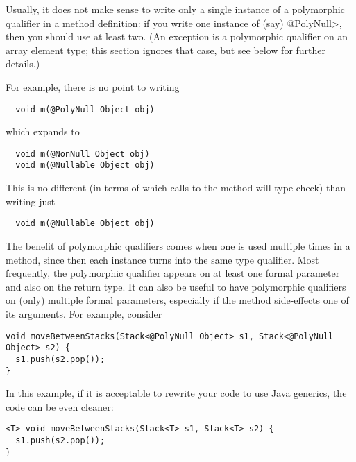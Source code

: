 
Usually, it does not make sense to write only a single instance of a polymorphic
qualifier in a method definition:  if you write one instance of (say)
\<@PolyNull>, then you should use at least two.  (An exception is a
polymorphic qualifier on an array element type; this section ignores that
case, but see below for further details.)

For example, there is no point to writing

\begin{Verbatim}
  void m(@PolyNull Object obj)
\end{Verbatim}

\noindent
which expands to

\begin{Verbatim}
  void m(@NonNull Object obj)
  void m(@Nullable Object obj)
\end{Verbatim}

This is no different (in terms of which calls to the method will
type-check) than writing just

\begin{Verbatim}
  void m(@Nullable Object obj)
\end{Verbatim}

The benefit of polymorphic qualifiers comes when one is used multiple times
in a method, since then each instance turns into the same type qualifier.
Most frequently, the polymorphic qualifier appears on at least one formal
parameter and also on the return type.  It can also be useful to have
polymorphic qualifiers on (only) multiple formal parameters, especially if
the method side-effects one of its arguments.
For example, consider

\begin{Verbatim}
void moveBetweenStacks(Stack<@PolyNull Object> s1, Stack<@PolyNull Object> s2) {
  s1.push(s2.pop());
}
\end{Verbatim}

\noindent
In this example, if it is acceptable to rewrite your code to use Java
generics, the code can be even cleaner:

\begin{Verbatim}
<T> void moveBetweenStacks(Stack<T> s1, Stack<T> s2) {
  s1.push(s2.pop());
}
\end{Verbatim}




